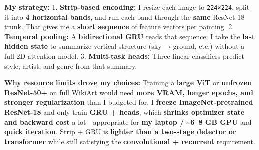 \documentclass[11pt]{article}
\begin{document}
\textbf{My strategy:} 1. \textbf{Strip-based encoding:} I resize each
image to \texttt{224×224}, split it into \textbf{4 horizontal bands},
and run each band through the \textbf{same} ResNet-18 trunk. That gives
me a \textbf{short sequence} of feature vectors per painting. 2.
\textbf{Temporal pooling:} A \textbf{bidirectional GRU} reads that
sequence; I take the \textbf{last hidden state} to summarize vertical
structure (sky → ground, etc.) without a full 2D attention model. 3.
\textbf{Multi-task heads:} Three linear classifiers predict style,
artist, and genre from that summary.

\textbf{Why resource limits drove my choices:} Training a \textbf{large
ViT} or \textbf{unfrozen ResNet-50+} on full WikiArt would need
\textbf{more VRAM, longer epochs, and stronger regularization} than I
budgeted for. I \textbf{freeze ImageNet-pretrained ResNet-18} and only
train \textbf{GRU + heads}, which \textbf{shrinks optimizer state and
backward cost} a lot---appropriate for \textbf{my laptop /
\textasciitilde6--8 GB GPU} and \textbf{quick iteration}. Strip + GRU is
\textbf{lighter than a two-stage detector or transformer} while still
satisfying the \textbf{convolutional + recurrent} requirement.
\end{document}
